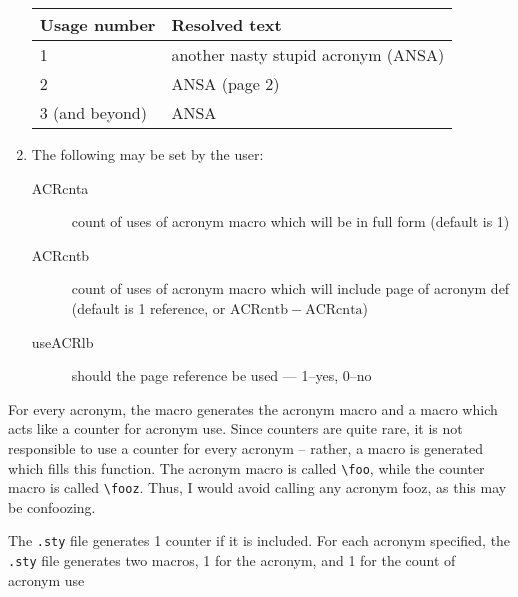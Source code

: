 \documentclass[DIV=10, fontsize=12pt, pagesize=auto]{scrartcl}
\begin{document}
\begin{enumerate}
  \begin{tabular}{@{}ll@{}}
    \toprule
    Usage number   & Resolved text                       \\
    \midrule
    1              & another nasty stupid acronym (ANSA) \\
    2              & ANSA (page 2)                       \\
    3 (and beyond) & ANSA                                \\
    \bottomrule
  \end{tabular}
  \medskip
\item The following may be set by the user:
  \begin{description}
  \item[ACRcnta] count of uses of acronym macro which will be in full form  
    (default is 1)
  \item[ACRcntb] count of uses of acronym macro which will include page of
    acronym def (default is 1 reference, or $\mathrm{ACRcntb}-\mathrm{ACRcnta}$)
  \item[useACRlb] should the page reference be used --- 1--yes, 0--no
  \end{description}
\end{enumerate}

For every acronym, the macro generates the acronym macro and a macro which
acts like a counter for acronym use.  Since counters are quite rare, it is
not responsible to use a counter for every acronym -- rather, a macro is
generated which fills this function.  The acronym macro is called \verb+\foo+,
while the counter macro is called \verb+\fooz+.  Thus, I would avoid calling any
acronym \textsf{fooz}, as this may be confoozing.

The \texttt{.sty} file generates 1 counter if it is included.  For each acronym
specified, the \texttt{.sty} file generates two macros, 1 for the acronym, and 1 for
the count of acronym use
\end{document}
